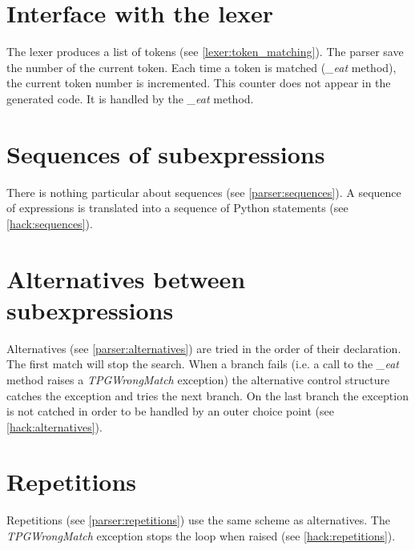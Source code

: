 \section{Interface with the lexer}

The lexer produces a list of tokens (see \ref{lexer:token_matching}).
The parser save the number of the current token.
Each time a token is matched (\emph{\_eat} method), the current token number is incremented.
This counter does not appear in the generated code. It is handled by the \emph{\_eat} method.

\section{Sequences of subexpressions}

There is nothing particular about sequences (see \ref{parser:sequences}).
A sequence of expressions is translated into a sequence of Python statements (see \ref{hack:sequences}).

\section{Alternatives between subexpressions}

Alternatives (see \ref{parser:alternatives}) are tried in the order of their declaration.
The first match will stop the search.
When a branch fails (i.e. a call to the \emph{\_eat} method raises a \emph{TPGWrongMatch} exception)
the alternative control structure catches the exception and tries the next branch.
On the last branch the exception is not catched in order to be handled by an outer choice point
(see \ref{hack:alternatives}).

\section{Repetitions}

Repetitions (see \ref{parser:repetitions}) use the same scheme as alternatives.
The \emph{TPGWrongMatch} exception stops the loop when raised
(see \ref{hack:repetitions}).
